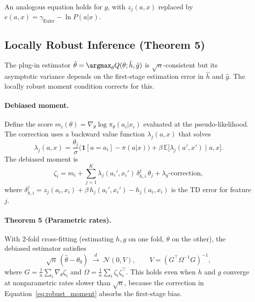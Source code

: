 \documentclass[10pt]{article}
\newcommand{\E}{\mathbb{E}}
\begin{document}
An analogous equation holds for $g$, with $z_j(a,x)$ replaced by $e(a,x) = \gamma_{\text{Euler}} - \ln P(a|x)$.


\subsection{Locally Robust Inference (Theorem 5)}

The plug-in estimator $\tilde\theta = \argmax_\theta Q(\theta; \hat h, \hat g)$ is $\sqrt{n}$-consistent but its asymptotic variance depends on the first-stage estimation error in $\hat h$ and $\hat g$. The locally robust moment condition corrects for this.

\paragraph{Debiased moment.}
Define the score $m_i(\theta) = \nabla_\theta \log \pi_\theta(a_i|x_i)$ evaluated at the pseudo-likelihood. The correction uses a backward value function $\lambda_j(a,x)$ that solves
\begin{equation}
\label{eq:backward}
\lambda_j(a,x) = \frac{\theta_j}{\sigma}\bigl(\mathbf{1}[a = a_i] - \pi(a|x)\bigr) + \beta\,\E\bigl[\lambda_j(a',x') \mid a,x\bigr].
\end{equation}
The debiased moment is
\begin{equation}
\label{eq:robust_moment}
\zeta_i = m_i + \sum_{j=1}^K \lambda_j(a_i', x_i')\,\delta^j_{h,i}\,\theta_j + \lambda_g\text{-correction},
\end{equation}
where $\delta^j_{h,i} = z_j(a_i,x_i) + \beta\,h_j(a_i',x_i') - h_j(a_i,x_i)$ is the TD error for feature $j$.

\paragraph{Theorem 5 (Parametric rates).}
With 2-fold cross-fitting (estimating $h,g$ on one fold, $\theta$ on the other), the debiased estimator satisfies
\begin{equation}
\sqrt{n}\,(\hat\theta - \theta_0) \;\xrightarrow{d}\; \mathcal{N}(0, V), \qquad V = (G^\top \Omega^{-1} G)^{-1},
\end{equation}
where $G = \frac{1}{n}\sum_i \nabla_\theta \zeta_i$ and $\Omega = \frac{1}{n}\sum_i \zeta_i\zeta_i^\top$. This holds even when $h$ and $g$ converge at nonparametric rates slower than $\sqrt{n}$, because the correction in Equation~\eqref{eq:robust_moment} absorbs the first-stage bias.
\end{document}
